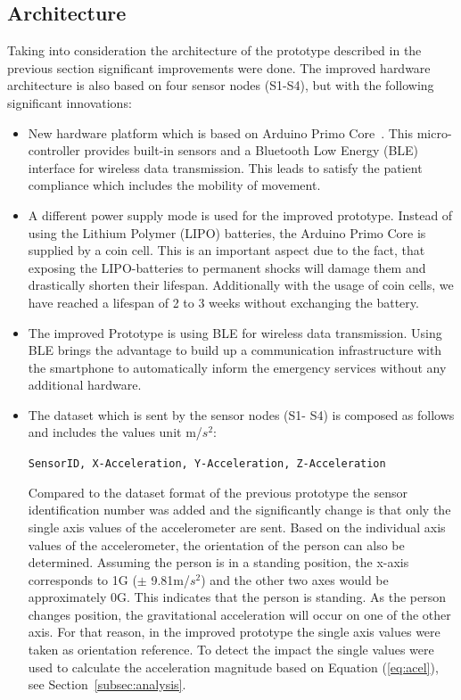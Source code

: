 \documentclass[review]{elsarticle}
\begin{document}
\subsection{Architecture}
\label{sub:improvedprototypearchitecture}

Taking into consideration the architecture of the prototype described in the previous 
section significant improvements were done. The improved hardware architecture is also 
based on four sensor nodes (S1-S4), but with the following significant innovations:

\begin{itemize}
 \item New hardware platform which is based on Arduino Primo Core~\cite{Arduino2018}. 
 This micro-controller provides built-in sensors and a Bluetooth Low Energy (BLE) 
 interface for wireless data transmission. This leads to satisfy the patient compliance
 which includes the mobility of movement.
 \item A different power supply mode is used for the improved prototype. Instead of 
 using the Lithium Polymer (LIPO) batteries, the Arduino Primo Core is supplied by a 
 coin cell. This is an important aspect due to the fact, that exposing the LIPO-batteries 
 to permanent shocks will damage them and drastically shorten their lifespan. 
 Additionally with the usage of coin cells, we have reached a lifespan of 2 to 3 weeks 
 without exchanging the battery.
 \item The improved Prototype is using BLE for wireless data transmission. Using BLE 
 brings the advantage to build up a communication infrastructure with the smartphone 
 to automatically inform the emergency services without any additional hardware.
 \item The dataset which is sent by the sensor nodes (S1- S4) is composed as follows 
 and includes the values unit m/$s^2$:
 \begin{center}
  \texttt{SensorID, X-Acceleration, Y-Acceleration, Z-Acceleration}
 \end{center}
 Compared to the dataset format of the previous prototype the sensor identification 
 number was added and the significantly change is that only the single axis values of 
 the accelerometer are sent. Based on the individual axis values of the accelerometer, 
 the orientation of the person can also be determined. Assuming the person is in a standing 
 position, the x-axis corresponds to 1G ($\pm$ 9.81m/$s^2$) and the other two axes would be 
 approximately 0G. This indicates that the person is standing. As the person changes 
 position, the gravitational acceleration will occur on one of the other axis. For that 
 reason, in the improved prototype the single axis values were taken as orientation 
 reference. To detect the impact the single values were used to calculate the acceleration 
 magnitude based on Equation (\ref{eq:acel}), see Section~\ref{subsec:analysis}.
\end{itemize}
\end{document}
